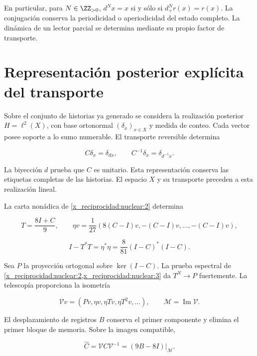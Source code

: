 En particular, para \(N\in\ZZ_{>0}\),
\(d^Nx=x\) si y sólo si \(d_+^Nr(x)=r(x)\).
La conjugación conserva la periodicidad o aperiodicidad del estado
completo. La dinámica de un lector parcial se determina mediante
su propio factor de transporte.

\section{Representación posterior explícita del transporte}

Sobre el conjunto de historias ya generado se considera la realización
posterior \(H=\ell^2(X)\), con base ortonormal
\((\delta_x)_{x\in X}\) y medida de conteo. Cada vector posee soporte
a lo sumo numerable. El transporte reversible determina



\[
C\delta_x=\delta_{d x},\qquad C^{-1}\delta_x=\delta_{d^{-1}x}.
\]



La biyección \(d\) prueba que \(C\) es unitario.
Esta representación conserva las etiquetas completas de las historias.
El espacio \(X\) y su transporte preceden a esta realización lineal.

La carta nonádica de \cref{x_reciprocidad:nuclear:2} determina



\[
T=\frac{8I+C}{9},\qquad
\eta v=\frac1{27}(8(C-I)v,-(C-I)v,\ldots,-(C-I)v),
\]





\[
I-T^*T=\eta^*\eta=\frac8{81}(I-C)^*(I-C).
\]



Sea \(P\) la proyección ortogonal sobre \(\ker(I-C)\).
La prueba espectral de \cref{x_reciprocidad:nuclear:2,x_reciprocidad:nuclear:3} da
\(T^N\to P\) fuertemente. La telescopía proporciona la isometría



\[
\mathcal Vv=(Pv,\eta v,\eta Tv,\eta T^2v,\ldots),\qquad
\mathcal M=\operatorname{Im}\mathcal V.
\]



El desplazamiento de registros \(B\) conserva el primer componente
y elimina el primer bloque de memoria. Sobre la imagen compatible,



\begin{equation}
\boxed{\widehat C=\mathcal VC\mathcal V^{-1}
=(9B-8I)|_{\mathcal M}.}
\label{x_reciprocidad:nuc09:transporte-recuperado}
\end{equation}



